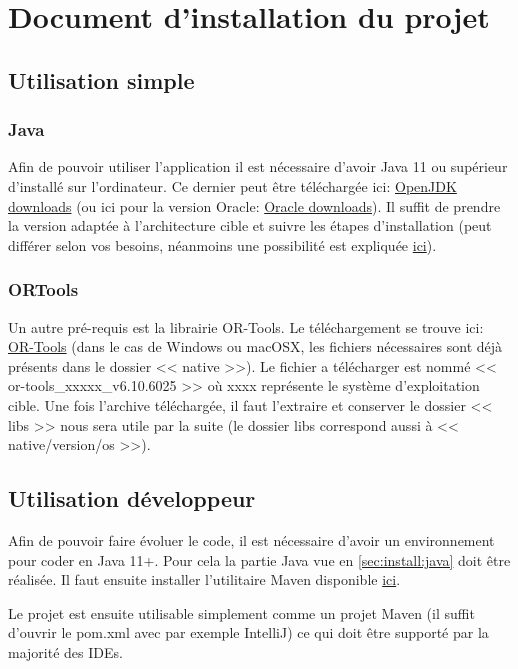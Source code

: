 \documentclass[final]{polytech/polytech}
\begin{document}
\chapter{Document d'installation du projet}
	\section{Utilisation simple}
		\subsection{Java\label{sec:install:java}}
			Afin de pouvoir utiliser l'application il est nécessaire d'avoir Java 11 ou supérieur d'installé sur l'ordinateur.
			Ce dernier peut être téléchargée ici: \href{https://jdk.java.net/}{OpenJDK downloads} (ou ici pour la version Oracle: \href{https://www.oracle.com/technetwork/java/javase/downloads/index.html}{Oracle downloads}).
			Il suffit de prendre la version adaptée à l'architecture cible et suivre les étapes d'installation (peut différer selon vos besoins, néanmoins une possibilité est expliquée \href{https://stackoverflow.com/a/52531093/3281185}{ici}).

		\subsection{ORTools}
			Un autre pré-requis est la librairie OR-Tools.
			Le téléchargement se trouve ici: \href{https://github.com/google/or-tools/releases/tag/v6.10}{OR-Tools} (dans le cas de Windows ou macOSX, les fichiers nécessaires sont déjà présents dans le dossier << native >>).
			Le fichier a télécharger est nommé << or-tools\_xxxxx\_v6.10.6025 >> où xxxx représente le système d'exploitation cible.
			Une fois l'archive téléchargée, il faut l'extraire et conserver le dossier << libs >> nous sera utile par la suite (le dossier libs correspond aussi à << native/version/os >>).

	\section{Utilisation développeur}
		Afin de pouvoir faire évoluer le code, il est nécessaire d'avoir un environnement pour coder en Java 11+.
		Pour cela la partie Java vue en \autoref{sec:install:java} doit être réalisée.
		Il faut ensuite installer l'utilitaire Maven disponible \href{https://maven.apache.org/download.cgi}{ici}.
		
		Le projet est ensuite utilisable simplement comme un projet Maven (il suffit d'ouvrir le pom.xml avec par exemple IntelliJ) ce qui doit être supporté par la majorité des IDEs.
		
\end{document}
